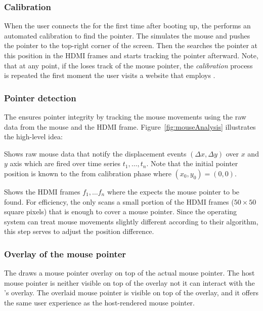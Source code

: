 \subsubsection{\bfseries Calibration}\label{sec:systemDesign:analysis:calibration} When the user connects the \device for the first time after booting up, the \device performs an automated calibration to find the pointer. The \device simulates the mouse and pushes the pointer to the top-right corner of the screen. Then the \device searches the pointer at this position in the HDMI frames
and starts tracking the pointer afterward. Note, that at any point, if the \device loses track of the mouse pointer, the \emph{calibration} process is repeated the first moment the user visits a website that employs \name.

\subsubsection{\bfseries Pointer detection} The \device ensures pointer integrity by tracking the mouse movements using the raw data from the mouse and the HDMI frame.  Figure~\ref{fig:mouseAnalysis} illustrates the high-level idea: 

\begin{mylist}
\item[]\one Shows raw mouse data that notify the displacement events $(\Delta x, \Delta y)$ over $x$ and $y$ axis which are fired over time series $t_1,\ldots, t_n$. Note that the initial pointer position is known to the \device from calibration phase where $(x_0, y_0) = (0, 0)$.  
\item[]\two Shows the HDMI frames $f_1,\ldots f_n$ where the \device expects the mouse pointer to be found. For efficiency, the \device only scans a small portion of the HDMI frames ($50 \times 50$ square pixels) that is enough to cover a mouse pointer. Since the operating system can treat mouse movements slightly different according to their algorithm, this step serves to adjust the position difference.
\end{mylist}


\subsubsection{\bfseries Overlay of the mouse pointer} The \device draws a mouse pointer overlay on top of the actual mouse pointer. The host mouse pointer is neither visible on top of the overlay not it can interact with the \device's overlay. The overlaid mouse pointer is visible on top of the overlay, and it offers the same user experience as the host-rendered mouse pointer.


